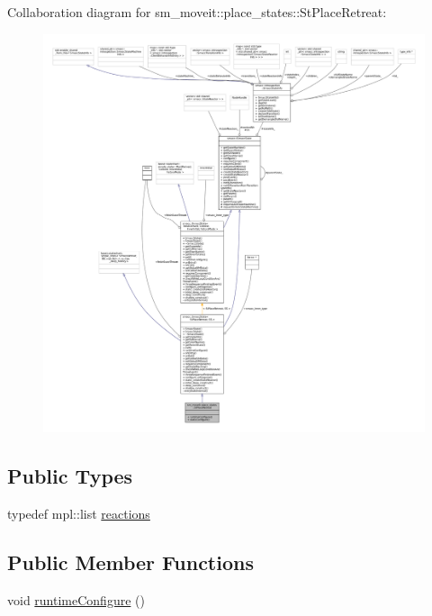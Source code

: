 Collaboration diagram for sm\+\_\+moveit\+:\+:place\+\_\+states\+:\+:St\+Place\+Retreat\+:
\nopagebreak
\begin{figure}[H]
\begin{center}
\leavevmode
\includegraphics[width=350pt]{structsm__moveit_1_1place__states_1_1StPlaceRetreat__coll__graph}
\end{center}
\end{figure}
\subsection*{Public Types}
\begin{DoxyCompactItemize}
\item 
typedef mpl\+::list \hyperlink{structsm__moveit_1_1place__states_1_1StPlaceRetreat_a9bf92659dcf05ff9f3a9f6828e69d6a4}{reactions}
\end{DoxyCompactItemize}
\subsection*{Public Member Functions}
\begin{DoxyCompactItemize}
\item 
void \hyperlink{structsm__moveit_1_1place__states_1_1StPlaceRetreat_ab821f5ef9e9ffb35ba9f63917dac2854}{runtime\+Configure} ()
\end{DoxyCompactItemize}
